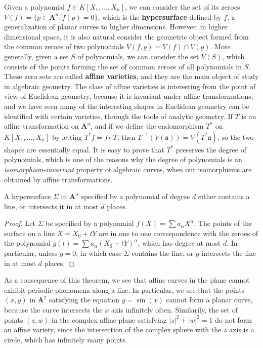 Given a polynomial $f \in K[X_1, \dots, X_n]$, we can consider the set of its zeroes $V(f) = \{ p \in \mathbf{A}^n : f(p) = 0 \}$, which is the {\bf hypersurface} defined by $f$, a generalization of planar curves to higher dimensions. However, in higher dimensional space, it is also natural consider the geometric object formed from the common zeroes of two polynomials $V(f,g) = V(f) \cap V(g)$. More generally, given a set $S$ of polynomials, we can consider the set $V(S)$, which consists of the points forming the set of common zeroes of all polynomials in $S$. These zero sets are called {\bf affine varieties}, and they are the main object of study in algebraic geometry. The class of affine varieties is interesting from the point of view of Euclidean geometry, because it is invariant under affine transformations, and we have seen many of the interesting shapes in Euclidean geometry can be identified with certain varieties, through the tools of analytic geometry. If $T$ is an affine transformation on $\mathbf{A}^n$, and if we define the endomorphism $T^*$ on $K[X_1, \dots, X_n]$ by letting $T^*f = f \circ T$, then $T^{-1}(V(\mathfrak{a})) = V(T^* \mathfrak{a})$, so the two shapes are essentially equal. It is easy to prove that $T^*$ preserves the degree of polynomials, which is one of the reasons why the degree of polynomials is an {\it isomorphism-invariant} property of algebraic curves, when our isomorphisms are obtained by affine transformations.

\begin{theorem}
    A hypersurface $\Sigma$ in $\mathbf{A}^n$ specified by a polynomial of degree $d$ either contains a line, or intersects it in at most $d$ places.
\end{theorem}
\begin{proof}
    Let $\Sigma$ be specified by a polynomial $f(X) = \sum a_\alpha X^\alpha$. The points of the surface on a line $X = X_0 + t Y$ are in one to one correspondence with the zeroes of the polynomial $g(t) = \sum a_\alpha (X_0 + t Y)^\alpha$, which has degree at most $d$. In particular, unless $g = 0$, in which case $\Sigma$ contains the line, or $g$ intersects the line in at most $d$ places.
\end{proof}

As a consequence of this theorem, we see that affine curves in the plane cannot exhibit periodic phenomena along a line. In particular, we see that the points $(x,y)$ in $\mathbf{A}^2$ satisfying the equation $y = \sin(x)$ cannot form a planar curve, because the curve intersects the $x$ axis infinitely often. Similarily, the set of points $(z,w)$ in the complex affine plane satisfying $|z|^2 + |w|^2 = 1$ do not form an affine variety, since the intersection of the complex sphere with the $z$ axis is a circle, which has infinitely many points.

